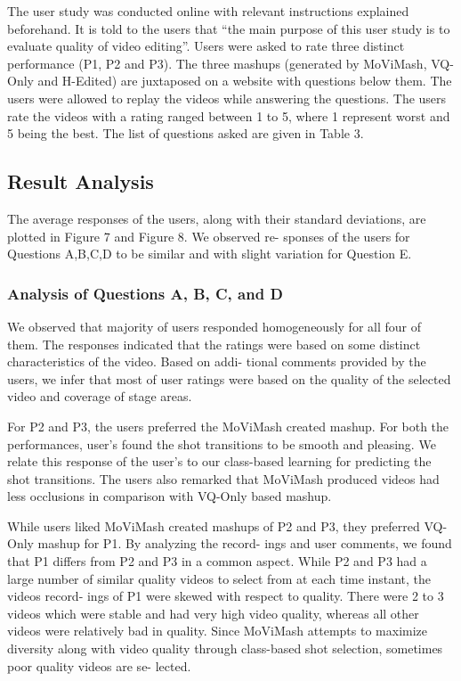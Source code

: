 \documentclass{sig-alternate}
\providecommand{\DIFadd}[1]{{\protect\color{blue}\uwave{#1}}} %
\providecommand{\DIFaddbegin}{} %
\providecommand{\DIFaddend}{} %
\begin{document}
The user study was conducted online with relevant instructions
explained beforehand. It is told to the users that “the main purpose
of this user study is to evaluate quality of video editing”. Users
were asked to rate three distinct performance (P1, P2 and P3). The
three mashups (generated by MoViMash, VQ-Only and H-Edited)
are juxtaposed on a website with questions below them. The users
were allowed to replay the videos while answering the questions.
The users rate the videos with a rating ranged between 1 to 5, where
1 represent worst and 5 being the best. The list of questions asked
are given in Table 3.

\subsection{Result Analysis}
\DIFaddbegin \DIFadd{I am a new sentence.
}\DIFaddend The average responses of the users, along with their standard
deviations, are plotted in Figure 7 and Figure 8. We observed re-
sponses of the users for Questions A,B,C,D to be similar and with
slight variation for Question E.

\subsubsection{Analysis of Questions A, B, C, and D}
\DIFaddbegin \DIFadd{I am a new sentence.
}\DIFaddend We observed that majority of users responded homogeneously
for all four of them. The responses indicated that the ratings were
based on some distinct characteristics of the video. Based on addi-
tional comments provided by the users, we infer that most of user
ratings were based on the quality of the selected video and coverage
of stage areas.

For P2 and P3, the users preferred the MoViMash created mashup.
For both the performances, user’s found the shot transitions to be
smooth and pleasing. We relate this response of the user’s to our
class-based learning for predicting the shot transitions. The users
also remarked that MoViMash produced videos had less occlusions
in comparison with VQ-Only based mashup.

While users liked MoViMash created mashups of P2 and P3,
they preferred VQ-Only mashup for P1. By analyzing the record-
ings and user comments, we found that P1 differs from P2 and P3 in
a common aspect. While P2 and P3 had a large number of similar
quality videos to select from at each time instant, the videos record-
ings of P1 were skewed with respect to quality. There were 2 to 3
videos which were stable and had very high video quality, whereas
all other videos were relatively bad in quality. Since MoViMash
attempts to maximize diversity along with video quality through
class-based shot selection, sometimes poor quality videos are se-
lected.
\end{document}
